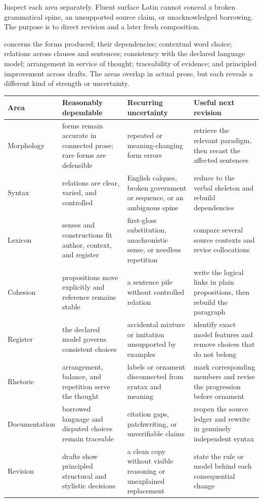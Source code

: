 
Inspect each area separately. Fluent surface Latin cannot conceal a broken
grammatical spine, an unsupported source claim, or unacknowledged borrowing.
The purpose is to direct revision and a later fresh composition.

 concerns the forms produced;  their
dependencies;  contextual word choice; 
relations across clauses and sentences;  consistency with the
declared language model;  arrangement in service of thought;
 traceability of evidence; and 
principled improvement across drafts. The areas overlap in actual prose, but
each reveals a different kind of strength or uncertainty.

\begin{xltabular}{\linewidth}{@{}P{1.25in}P{2.0in}P{1.75in}Y@{}}
  \toprule
  \textbf{Area} & \textbf{Reasonably dependable} &
  \textbf{Recurring uncertainty} & \textbf{Useful next revision} \\
  \midrule\endhead
  Morphology & forms remain accurate in connected prose; rare forms are
       defensible & repeated or meaning-changing form errors & retrieve the
       relevant paradigm, then recast the affected sentences \\
  Syntax & relations are clear, varied, and controlled & English calques,
       broken government or sequence, or an ambiguous spine & reduce to the
       verbal skeleton and rebuild dependencies \\
  Lexicon & senses and constructions fit author, context, and register &
       first-gloss substitution, anachronistic sense, or needless repetition &
       compare several source contexts and revise collocations \\
  Cohesion & propositions move explicitly and reference remains stable & a
       sentence pile without controlled relation & write the logical links in
       plain propositions, then rebuild the paragraph \\
  Register & the declared model governs consistent choices & accidental
       mixture or imitation unsupported by examples & identify exact model
       features and remove choices that do not belong \\
  Rhetoric & arrangement, balance, and repetition serve the thought & labels
       or ornament disconnected from syntax and meaning & mark corresponding
       members and revise the progression before ornament \\
  Documentation & borrowed language and disputed choices remain traceable &
       citation gaps, patchwriting, or unverifiable claims & reopen the source
       ledger and rewrite in genuinely independent syntax \\
  Revision & drafts show principled structural and stylistic decisions & a
       clean copy without visible reasoning or unexplained replacement & state
       the rule or model behind each consequential change \\
  \bottomrule
\end{xltabular}
